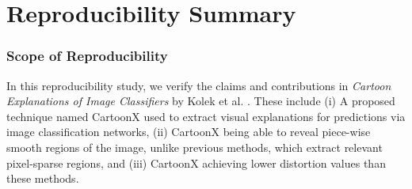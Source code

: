 \section*{\centering Reproducibility Summary}


\subsubsection*{Scope of Reproducibility}

 In this reproducibility study, we verify the claims and contributions in {\it Cartoon Explanations of Image Classifiers} by Kolek et al. \cite{kolek2022cartoon}. These include (i) A proposed technique named CartoonX used to extract visual explanations for predictions via image classification networks, (ii) CartoonX being able to reveal piece-wise smooth regions of the image, unlike previous methods, which extract relevant pixel-sparse regions, and (iii) CartoonX achieving lower distortion values than these methods.


